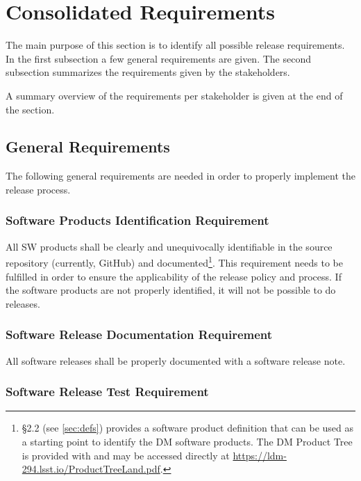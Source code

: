 \newpage
\section{Consolidated Requirements} \label{sec:reqdef}

The main purpose of this section is to identify all possible release requirements.
In the first subsection a few general requirements are given.
The second subsection summarizes the requirements given by the stakeholders.

A summary overview of the requirements per stakeholder is given at the end of the section.


\subsection{General Requirements} \label{sec:genreq}

The following general requirements are needed in order to properly implement the release process.


\subsubsection{Software Products Identification Requirement} \label{sec:swid}

All \gls{SW} products shall be clearly and unequivocally identifiable in the source repository (currently, GitHub) and documented\footnote{
 \S2.2 (see \ref{sec:defs}) provides a software product definition that can be used as a starting point to identify the DM software products.
The DM Product Tree is provided with  and may be accessed directly at \url{https://ldm-294.lsst.io/ProductTreeLand.pdf}.}.
This requirement needs to be fulfilled in order to ensure the applicability of the release policy and process.
If the software products are not properly identified, it will not be possible to do releases.


\subsubsection{Software Release Documentation Requirement} \label{sec:reqdoc}

All software releases shall be properly documented with a software release note.


\subsubsection{Software Release Test Requirement} \label{sec:test}

